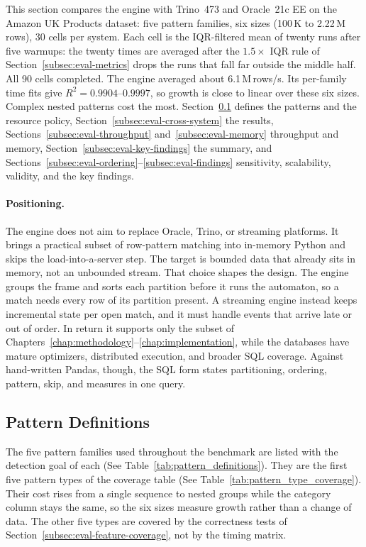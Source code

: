 This section compares the engine with Trino~473 and Oracle~21c EE on
the Amazon UK Products dataset: five pattern families, six sizes
(100\,K to 2.22\,M rows), 30 cells per system.  Each cell is the
IQR-filtered mean of twenty runs after five warmups: the twenty times
are averaged after the $1.5\times$ IQR rule of
Section~\ref{subsec:eval-metrics} drops the runs that fall far outside
the middle half.  All 90 cells completed.  The engine averaged about
6.1\,M\,rows/s.  Its per-family
time fits give $R^2=0.9904$--$0.9997$, so growth is close to linear
over these six sizes.  Complex nested patterns cost the most.
Section~\ref{subsec:eval-pattern-defs} defines the
patterns and the resource policy,
Section~\ref{subsec:eval-cross-system} the results,
Sections~\ref{subsec:eval-throughput}
and~\ref{subsec:eval-memory} throughput and memory,
Section~\ref{subsec:eval-key-findings} the summary, and
Sections~\ref{subsec:eval-ordering}--\ref{subsec:eval-findings} sensitivity,
scalability, validity, and the key findings.

\paragraph{Positioning.}
The engine does not aim to replace Oracle, Trino, or streaming
platforms.  It brings a practical subset of row-pattern matching into
in-memory Python and skips the load-into-a-server step.  The target is
bounded data that already sits in memory, not an unbounded stream.
That choice shapes the design.  The engine groups the frame and sorts
each partition before it runs the automaton, so a match needs every row
of its partition present.  A streaming engine instead keeps incremental
state per open match, and it must handle events that arrive late or out
of order.  In return it
supports only the subset of
Chapters~\ref{chap:methodology}--\ref{chap:implementation}, while the
databases have mature optimizers, distributed execution, and broader SQL
coverage.
Against hand-written Pandas, though, the SQL form states partitioning,
ordering, pattern, skip, and measures in one query.

\subsection{Pattern Definitions}
\label{subsec:eval-pattern-defs}

The five pattern families used throughout the benchmark are listed with
the detection goal of each (See Table~\ref{tab:pattern_definitions}).
They are the first five pattern types of the coverage table (See
Table~\ref{tab:pattern_type_coverage}).
Their cost rises from a single sequence to nested groups while the
category column stays the same, so the six sizes measure growth rather
than a change of data.  The other five types are covered
by the correctness tests of
Section~\ref{subsec:eval-feature-coverage}, not by the timing matrix.


